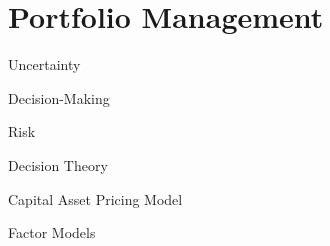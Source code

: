 \documentclass{beamer}
\begin{document}
\section{Portfolio Management}
\begin{frame}{Uncertainty}
\end{frame}

\begin{frame}{Decision-Making}
\end{frame}

\begin{frame}{Risk}
\end{frame}

\begin{frame}{Decision Theory}
\end{frame}

\begin{frame}{Capital Asset Pricing Model}
\end{frame}

\begin{frame}{Factor Models}
\end{frame}
\end{document}
